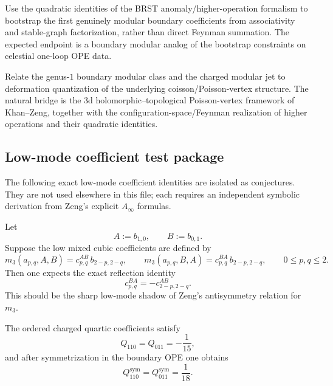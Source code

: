 \begin{problem}
Use the quadratic identities of the BRST anomaly/higher-operation formalism to bootstrap the
first genuinely modular boundary coefficients from associativity and stable-graph factorization,
rather than direct Feynman summation. The expected endpoint is a boundary modular analog of
the bootstrap constraints on celestial one-loop OPE data.
\end{problem}

\begin{problem}
Relate the genus-$1$ boundary modular class and the charged modular jet to deformation
quantization of the underlying coisson/Poisson-vertex structure. The natural bridge is the
$3$d holomorphic--topological Poisson-vertex framework of Khan--Zeng, together with the
configuration-space/Feynman realization of higher operations and their quadratic identities.
\end{problem}

\subsection{Low-mode coefficient test package}

The following exact low-mode coefficient identities are isolated as
conjectures. They are not used elsewhere in this file; each requires an
independent symbolic derivation from Zeng's explicit $A_\infty$ formulas.

\begin{conjecture}
Let
\[
A:=b_{1,0},
\qquad
B:=b_{0,1}.
\]
Suppose the low mixed cubic coefficients are defined by
\[
m_3(a_{p,q},A,B)=c^{AB}_{p,q}\,b_{2-p,2-q},
\qquad
m_3(a_{p,q},B,A)=c^{BA}_{p,q}\,b_{2-p,2-q},
\qquad 0\le p,q\le 2.
\]
Then one expects the exact reflection identity
\[
c^{BA}_{p,q}=-c^{AB}_{2-p,2-q}.
\]
This should be the sharp low-mode shadow of Zeng's antisymmetry relation for $m_3$.
\end{conjecture}

\begin{conjecture}
The ordered charged quartic coefficients satisfy
\[
Q_{110}=Q_{011}=-\frac1{15},
\]
and after symmetrization in the boundary OPE one obtains
\[
Q_{110}^{\mathrm{sym}}=Q_{011}^{\mathrm{sym}}=\frac1{18}.
\]
\end{conjecture}

